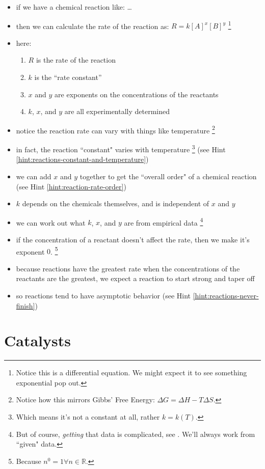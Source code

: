 \documentclass[11pt, oneside]{article}   	%
\begin{document}
\begin{itemize}
\item if we have a chemical reaction like:  \ldots
\item then we can calculate the rate of the reaction as: $R = k [A]^{x} [B]^{y}$
\footnote{Notice this is a differential equation. We might expect it to see something exponential pop out.}
\item here:
\begin{enumerate}
\item $R$ is the rate of the reaction
\item $k$ is the ``rate constant''
\item $x$ and $y$ are exponents on the concentrations of the reactants
\item $k$, $x$, and $y$ are all experimentally determined
\end{enumerate}
\item notice the reaction rate can vary with things like temperature
\footnote{Notice how this mirrors Gibbs' Free Energy: $\Delta G = \Delta H - T \Delta S$.}
\item in fact, the reaction ``constant" varies with temperature 
\footnote{Which means it's not a constant at all, rather $k = k(T)$.}
(see Hint \ref{hint:reactions-constant-and-temperature})
\item we can add $x$ and $y$ together to get the ``overall order" of a chemical reaction (see Hint \ref{hint:reaction-rate-order})
\item $k$ depends on the chemicals themselves, and is independent of $x$ and $y$
\item we can work out what $k$, $x$, and $y$ are from empirical data
\footnote{But of course, \emph{getting} that data is complicated, see \cite[p. 466]{wile-chem-2}. We'll always work from ``given" data.}
\item if the concentration of a reactant doesn't affect the rate, then we make it's exponent $0$.
\footnote{Because $n^{0} = 1 \forall n \in \mathbb{R} $.}
\item because reactions have the greatest rate when the concentrations of the reactants are the greatest, we expect a reaction to start strong and taper off
\item so reactions tend to have asymptotic behavior (see Hint \ref{hint:reactions-never-finish})
\end{itemize}

\section{Catalysts}
\end{document}
